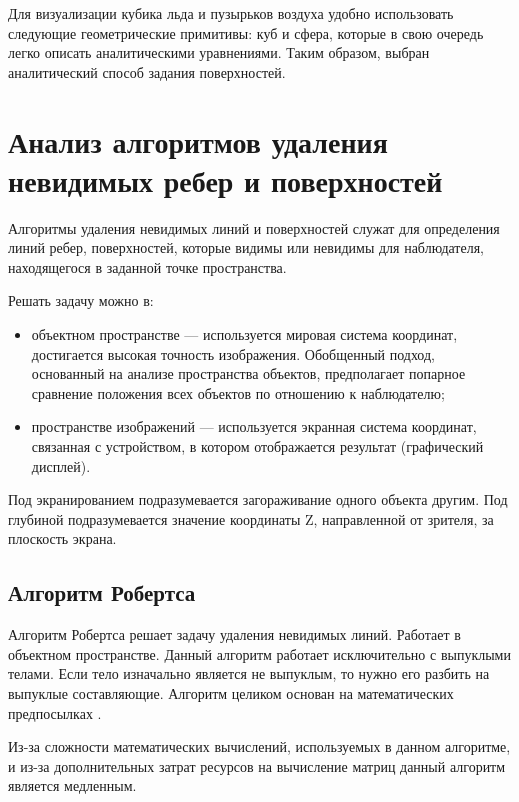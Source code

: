 Для визуализации кубика льда и пузырьков воздуха удобно использовать следующие геометрические примитивы: куб и сфера, которые в свою очередь легко описать аналитическими уравнениями. Таким образом, выбран аналитический способ задания поверхностей.

\section{Анализ алгоритмов удаления невидимых ребер и поверхностей}

Алгоритмы удаления невидимых линий и поверхностей служат для определения линий ребер, поверхностей, которые видимы или невидимы для наблюдателя, находящегося в заданной точке пространства.

Решать задачу можно в: 
\begin{itemize}
	\item объектном пространстве --- используется мировая система координат,
	достигается высокая точность изображения. Обобщенный подход, основанный на анализе пространства объектов, предполагает попарное сравнение положения всех объектов по отношению к наблюдателю;
	\item пространстве изображений --- используется экранная система координат, связанная с устройством, в котором отображается результат (графический дисплей).
\end{itemize}

Под экранированием подразумевается загораживание одного объекта другим. Под глубиной подразумевается значение координаты Z, направленной от зрителя, за плоскость экрана.

\subsection{Алгоритм Робертса}

Алгоритм Робертса решает задачу удаления невидимых линий. Работает в объектном пространстве. Данный алгоритм работает исключительно с выпуклыми телами. Если тело изначально является не выпуклым, то нужно его разбить на выпуклые составляющие. Алгоритм целиком основан на математических предпосылках \cite{roberts}.

Из-за сложности математических вычислений, используемых в данном
алгоритме, и из-за дополнительных затрат ресурсов на вычисление матриц
данный алгоритм является медленным.

